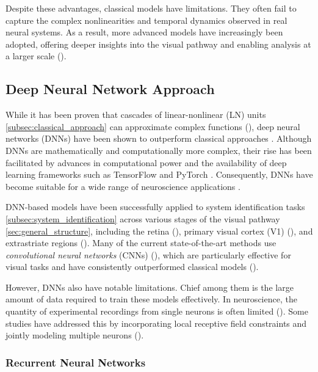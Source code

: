 Despite these advantages, classical models have limitations. They often fail to capture the complex nonlinearities and temporal dynamics observed in real neural systems. As a result, more advanced models have increasingly been adopted, offering deeper insights into the visual pathway and enabling analysis at a larger scale (\citet{Maheswaranathan340943, Butts11313, keat2001predicting}).

\subsection{Deep Neural Network Approach}
\label{subsec:deep_learning_approach}

While it has been proven that cascades of linear-nonlinear (LN) units \ref{subsec:classical_approach} can approximate complex functions (\citet{cybenko1989approximation, HORNIK1991251}), deep neural networks (DNNs) have been shown to outperform classical approaches \citep{MAL-006, Kriegeskorte2015dnn}. Although DNNs are mathematically and computationally more complex, their rise has been facilitated by advances in computational power and the availability of deep learning frameworks such as TensorFlow \citep{TensorFlow} and PyTorch \citep{paszke2017automatic}. Consequently, DNNs have become suitable for a wide range of neuroscience applications \citep{lecun2015deep}.

DNN-based models have been successfully applied to system identification tasks \ref{subsec:system_identification} across various stages of the visual pathway \ref{sec:general_structure}, including the retina (\cite{Maheswaranathan340943}), primary visual cortex (V1) (\citet{cadena2019conv, kindel2017usingdeeplearningreveal}), and extrastriate regions (\citet{zareh2024deep}). Many of the current state-of-the-art methods use \emph{convolutional neural networks} (CNNs) (\citet{NIPS2012_c399862d}), which are particularly effective for visual tasks and have consistently outperformed classical models (\citet{zhang2019convolutional, cadena2019conv}).

However, DNNs also have notable limitations. Chief among them is the large amount of data required to train these models effectively. In neuroscience, the quantity of experimental recordings from single neurons is often limited (\citet{zhang2019convolutional}). Some studies have addressed this by incorporating local receptive field constraints and jointly modeling multiple neurons (\citet{antolik2016local}).

\subsubsection{Recurrent Neural Networks}
\label{subsubsec:rnns}

